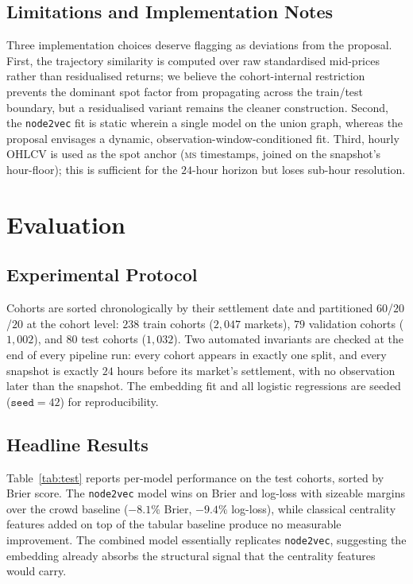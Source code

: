 \documentclass{article} %
\begin{document}
\subsection{Limitations and Implementation Notes}

Three implementation choices deserve flagging as deviations from the proposal. First, the trajectory similarity is computed over raw standardised mid-prices rather than residualised returns; we believe the cohort-internal restriction prevents the dominant spot factor from propagating across the train/test boundary, but a residualised variant remains the cleaner construction. Second, the \texttt{node2vec} fit is static wherein a single model on the union graph, whereas the proposal envisages a dynamic, observation-window-conditioned fit. Third, hourly OHLCV is used as the spot anchor (\textsc{ms} timestamps, joined on the snapshot's hour-floor); this is sufficient for the $24$-hour horizon but loses sub-hour resolution.

\section{Evaluation}

\subsection{Experimental Protocol}

Cohorts are sorted chronologically by their settlement date and partitioned $60$/$20$/$20$ at the cohort level: $238$ train cohorts ($2{,}047$ markets), $79$ validation cohorts ($1{,}002$), and $80$ test cohorts ($1{,}032$). Two automated invariants are checked at the end of every pipeline run: every cohort appears in exactly one split, and every snapshot is exactly $24$ hours before its market's settlement, with no observation later than the snapshot. The embedding fit and all logistic regressions are seeded ($\texttt{seed}=42$) for reproducibility.

\subsection{Headline Results}

Table~\ref{tab:test} reports per-model performance on the test cohorts, sorted by Brier score. The \texttt{node2vec} model wins on Brier and log-loss with sizeable margins over the crowd baseline ($-8.1\%$ Brier, $-9.4\%$ log-loss), while classical centrality features added on top of the tabular baseline produce no measurable improvement. The combined model essentially replicates \texttt{node2vec}, suggesting the embedding already absorbs the structural signal that the centrality features would carry.
\end{document}
